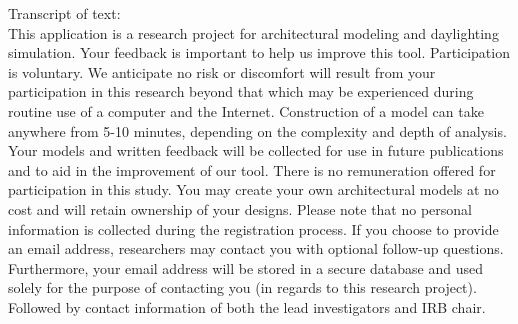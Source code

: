 \documentclass[12pt]{article}
\begin{document}
\noindent Transcript of text:\\
This application is a research project for architectural modeling and daylighting simulation. 
Your feedback is important to help us improve this tool. 
Participation is voluntary. We anticipate no risk or discomfort will result from your participation in this research beyond that which may be experienced during routine use of a computer and the Internet.
Construction of a model can take anywhere from 5-10 minutes, depending on the complexity and depth of analysis. Your models and written feedback will be collected for use in future publications and to aid in the improvement of our tool. 
There is no remuneration offered for participation in this study. You may create your own architectural models at no cost and will retain ownership of your designs.
Please note that no personal information is collected during the registration process. 
If you choose to provide an email address, researchers may contact you with optional follow-up questions.
Furthermore, your email address will be stored in a secure database and used solely for the purpose of contacting you (in regards to this research project).\\

\noindent Followed by contact information of both the lead investigators and IRB chair.
             
\end{document}
